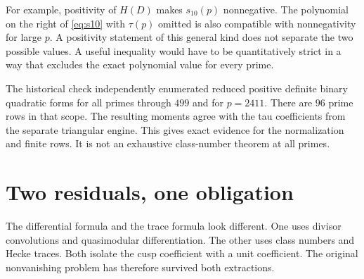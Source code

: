 For example, positivity of $H(D)$ makes $s_{10}(p)$ nonnegative. The polynomial on the right of \eqref{eq:s10} with $\tau(p)$ omitted is also compatible with nonnegativity for large $p$. A positivity statement of this general kind does not separate the two possible values. A useful inequality would have to be quantitatively strict in a way that excludes the exact polynomial value for every prime.

The historical check independently enumerated reduced positive definite binary quadratic forms for all primes through $499$ and for $p=2411$. There are $96$ prime rows in that scope. The resulting moments agree with the tau coefficients from the separate triangular engine. This gives exact evidence for the normalization and finite rows. It is not an exhaustive class-number theorem at all primes.

\section{Two residuals, one obligation}
The differential formula and the trace formula look different. One uses divisor convolutions and quasimodular differentiation. The other uses class numbers and Hecke traces. Both isolate the cusp coefficient with a unit coefficient. The original nonvanishing problem has therefore survived both extractions.


